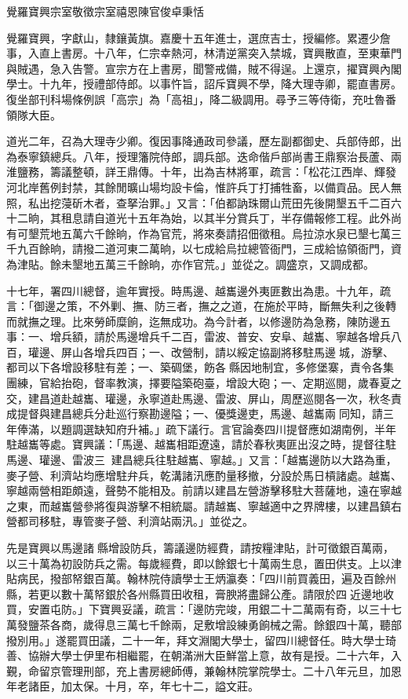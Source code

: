 
\begin{pinyinscope}
覺羅寶興宗室敬徵宗室禧恩陳官俊卓秉恬

覺羅寶興，字獻山，隸鑲黃旗。嘉慶十五年進士，選庶吉士，授編修。累遷少詹事，入直上書房。十八年，仁宗幸熱河，林清逆黨突入禁城，寶興散直，至東華門與賊遇，急入告警。宣宗方在上書房，聞警戒備，賊不得逞。上還京，擢寶興內閣學士。十九年，授禮部侍郎。以事忤旨，詔斥寶興不學，降大理寺卿，罷直書房。復坐部刊科場條例誤「高宗」為「高祖」，降二級調用。尋予三等侍衛，充吐魯番領隊大臣。

道光二年，召為大理寺少卿。復因事降通政司參議，歷左副都御史、兵部侍郎，出為泰寧鎮總兵。八年，授理籓院侍郎，調兵部。迭命偕戶部尚書王鼎察治長蘆、兩淮鹽務，籌議整頓，詳王鼎傳。十年，出為吉林將軍，疏言：「松花江西岸、輝發河北岸舊例封禁，其餘閒曠山場均設卡倫，惟許兵丁打捕牲畜，以備貢品。民人無照，私出挖蓡斫木者，查拏治罪。」又言：「伯都訥珠爾山荒田先後開墾五千二百六十二晌，其租息請自道光十五年為始，以其半分賞兵丁，半存備報修工程。此外尚有可墾荒地五萬六千餘晌，作為官荒，將來奏請招佃徵租。烏拉涼水泉已墾七萬三千九百餘晌，請撥二道河東二萬晌，以七成給烏拉總管衙門，三成給協領衙門，資為津貼。餘未墾地五萬三千餘晌，亦作官荒。」並從之。調盛京，又調成都。

十七年，署四川總督，逾年實授。時馬邊、越巂邊外夷匪數出為患。十九年，疏言：「御邊之策，不外剿、撫、防三者，撫之之道，在施於平時，斷無失利之後轉而就撫之理。比來勞師糜餉，迄無成功。為今計者，以修邊防為急務，陳防邊五事：一、增兵額，請於馬邊增兵千二百，雷波、普安、安阜、越巂、寧越各增兵八百，瓘邊、屏山各增兵四百；一、改營制，請以綏定協副將移駐馬邊城，游擊、都司以下各增設移駐有差；一、築碉堡，飭各縣因地制宜，多修堡寨，責令各集團練，官給抬砲，督率教演，擇要隘築砲臺，增設大砲；一、定期巡閱，歲春夏之交，建昌道赴越巂、瓘邊，永寧道赴馬邊、雷波、屏山，周歷巡閱各一次，秋冬責成提督與建昌總兵分赴巡行察勘邊隘；一、優獎邊吏，馬邊、越巂兩同知，請三年俸滿，以題調選缺知府升補。」疏下議行。言官論奏四川提督應如湖南例，半年駐越巂等處。寶興議：「馬邊、越巂相距遼遠，請於春秋夷匪出沒之時，提督往駐馬邊、瓘邊、雷波三，建昌總兵往駐越巂、寧越。」又言：「越巂邊防以大路為重，麥子營、利濟站均應增駐弁兵，乾溝諸汛應酌量移撤，分設於馬日槓諸處。越巂、寧越兩營相距頗遠，聲勢不能相及。前請以建昌左營游擊移駐大菩薩地，遠在寧越之東，而越巂營參將復與游擊不相統屬。請越巂、寧越適中之界牌樓，以建昌鎮右營都司移駐，專管麥子營、利濟站兩汛。」並從之。

先是寶興以馬邊諸縣增設防兵，籌議邊防經費，請按糧津貼，計可徵銀百萬兩，以三十萬為初設防兵之需。每歲經費，即以餘銀七十萬兩生息，置田供支。上以津貼病民，撥部帑銀百萬。翰林院侍讀學士王炳瀛奏：「四川前買義田，遍及百餘州縣，若更以數十萬帑銀於各州縣買田收租，膏腴將盡歸公產。請限於四近邊地收買，安置屯防。」下寶興妥議，疏言：「邊防完竣，用銀二十二萬兩有奇，以三十七萬發鹽茶各商，歲得息三萬七千餘兩，足敷增設練勇餉械之需。餘銀四十萬，聽部撥別用。」遂罷買田議，二十一年，拜文淵閣大學士，留四川總督任。時大學士琦善、協辦大學士伊里布相繼罷，在朝滿洲大臣鮮當上意，故有是授。二十六年，入覲，命留京管理刑部，充上書房總師傅，兼翰林院掌院學士。二十八年元旦，加恩年老諸臣，加太保。十月，卒，年七十二，謚文莊。


\end{pinyinscope}
